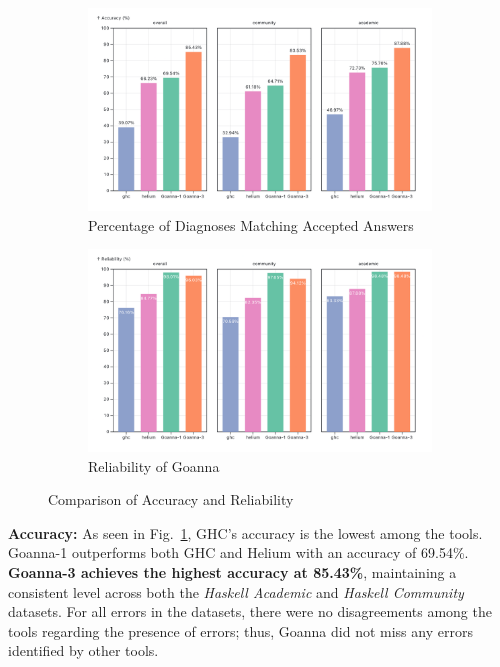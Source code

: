 \documentclass[pdflatex,sn-mathphys-num]{sn-jnl}%
\begin{document}
\begin{figure}[ht!]
    \centering
    \begin{subfigure}{0.49\linewidth}
        \centering
        \includegraphics[width=\linewidth]{images/accuracy.png}
        \caption{Percentage of Diagnoses Matching Accepted Answers} 
        \label{fig:accuracy}
    \end{subfigure}
    \hfill
    \begin{subfigure}{0.49\linewidth}
        \centering
        \includegraphics[width=\linewidth]{images/Reliability.png}
        \caption{Reliability of Goanna} 
        \label{fig:reliability}
    \end{subfigure}
    \caption{Comparison of Accuracy and Reliability}
    \label{fig:comparison}
\end{figure}

\textbf{Accuracy:} As seen in Fig.~\ref{fig:accuracy}, GHC's accuracy is the lowest among the tools. Goanna-1 outperforms both GHC and Helium with an accuracy of 69.54\%. \textbf{Goanna-3 achieves the highest accuracy at 85.43\%}, maintaining a consistent level across both the \textit{Haskell Academic} and \textit{Haskell Community} datasets. For all errors in the datasets, there were no disagreements among the tools regarding the presence of errors; thus, Goanna did not miss any errors identified by other tools.
\end{document}
